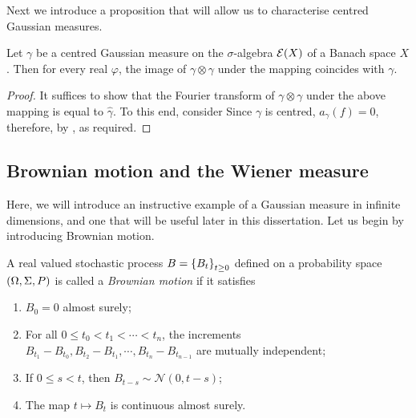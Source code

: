 \documentclass[../main.tex]{subfiles}
\begin{document}
Next we introduce a proposition that will allow us to characterise centred Gaussian measures.
\begin{proposition}
\label{prop:centred_gaussians}
Let $\gamma$ be a centred Gaussian measure on the $\sigma$-algebra $\mathcal{E}(X)$ of a Banach space $X$. Then for every real $\varphi$, the image of $\gamma\otimes\gamma$ under the mapping  coincides with $\gamma$.
\end{proposition}
\begin{proof}
It suffices to show that the Fourier transform of $\gamma\otimes\gamma$ under the above mapping is equal to $\hat\gamma$. To this end, consider  Since $\gamma$ is centred, $a_\gamma(f) = 0$, therefore, by ,  as required.
\end{proof}

\subsection{Brownian motion and the Wiener measure}
Here, we will introduce an instructive example of a Gaussian measure in infinite dimensions, and one that will be useful later in this dissertation. Let us begin by introducing Brownian motion.
\begin{definition}
\label{def:brownian_motion_1}
A real valued stochastic process $B = \cbr{B_t}_{t\geq0}$ defined on a probability space $\del{\Omega,\Sigma,P}$ is called a \emph{Brownian motion} if it satisfies \begin{enumerate}
    \item $B_0 = 0$ almost surely;
    \item For all $0 \leq t_0<t_1<\cdots<t_n$, the increments $B_{t_1} - B_{t_0}, B_{t_2} - B_{t_1}, \cdots, B_{t_n}-B_{t_{n-1}}$ are mutually independent;
    \item If $0\leq s<t$, then $B_{t-s}\sim\mathcal{N}(0,t-s)$;
    \item The map $t\mapsto B_t$ is continuous almost surely.
\end{enumerate}
\end{definition}
\end{document}
